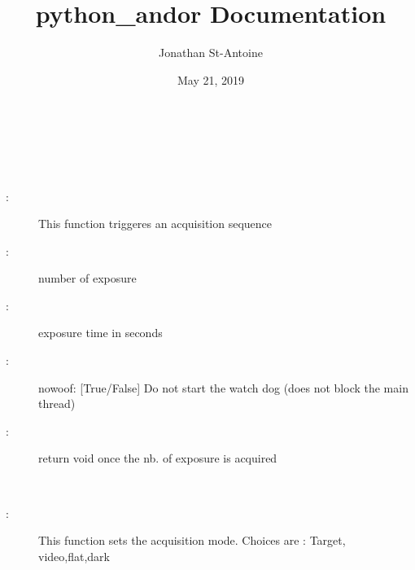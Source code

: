 \documentclass[letterpaper,10pt,english]{sphinxmanual}
\title{python\_andor Documentation}
\date{May 21, 2019}
\author{Jonathan St-Antoine}
\begin{document}
\maketitle
\sphinxtableofcontents
{}\label{\detokenize{index::doc}}


\begin{fulllineitems}
\label{\detokenize{index:python_andor.command}}~

\begin{fulllineitems}
\label{\detokenize{index:python_andor.command.acq}}~\begin{description}
\item[{:}] \leavevmode
This function triggeres an acquisition sequence

\item[{: }] \leavevmode
number of exposure

\item[{: }] \leavevmode
exposure time in seconds

\item[{:}] \leavevmode
\textendash{}nowoof\textendash{}: {[}True/False{]} Do not start the watch dog (does not block the main thread)

\item[{:}] \leavevmode
return void once the nb. of exposure is acquired

\end{description}

\end{fulllineitems}


\begin{fulllineitems}
\label{\detokenize{index:python_andor.command.acq_mode}}~\begin{description}
\item[{:}] \leavevmode
This function sets the acquisition mode. Choices are : Target, video,flat,dark


\end{description}
\end{fulllineitems}
\end{fulllineitems}
\end{document}
